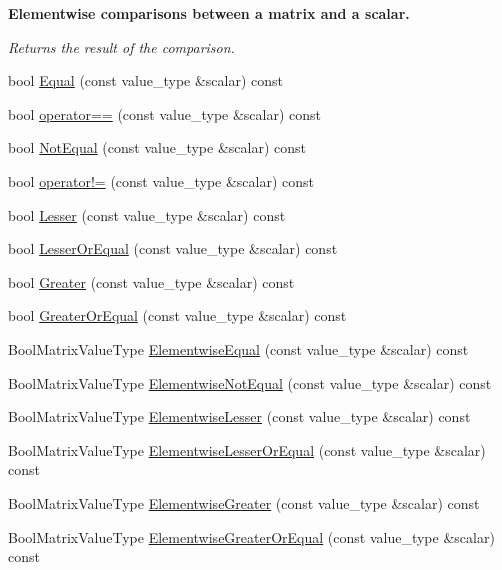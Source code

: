 \begin{Indent}{\bf Elementwise comparisons between a matrix and a scalar.}\par
{\em Returns the result of the comparison. }\begin{DoxyCompactItemize}
\item 
bool \hyperlink{classvct_fixed_size_const_matrix_base_a36ca5ac8c7cbbd004105516500745baf}{Equal} (const value\-\_\-type \&scalar) const 
\item 
bool \hyperlink{classvct_fixed_size_const_matrix_base_a832eede61d79334a7e0fde8916ce9ea0}{operator==} (const value\-\_\-type \&scalar) const 
\item 
bool \hyperlink{classvct_fixed_size_const_matrix_base_a5f29a2fbae7a7f896ebb164b8ce50afd}{Not\-Equal} (const value\-\_\-type \&scalar) const 
\item 
bool \hyperlink{classvct_fixed_size_const_matrix_base_ac801c30c3dbca24f1e1eda638b2d4940}{operator!=} (const value\-\_\-type \&scalar) const 
\item 
bool \hyperlink{classvct_fixed_size_const_matrix_base_ac91aa8965c40898902e4040714ebba1e}{Lesser} (const value\-\_\-type \&scalar) const 
\item 
bool \hyperlink{classvct_fixed_size_const_matrix_base_a1f326162855228b4ad951861f94baede}{Lesser\-Or\-Equal} (const value\-\_\-type \&scalar) const 
\item 
bool \hyperlink{classvct_fixed_size_const_matrix_base_a711d7e0c1e311eda99c2179027790685}{Greater} (const value\-\_\-type \&scalar) const 
\item 
bool \hyperlink{classvct_fixed_size_const_matrix_base_a97bd980245f7123133edd231922b0e77}{Greater\-Or\-Equal} (const value\-\_\-type \&scalar) const 
\item 
Bool\-Matrix\-Value\-Type \hyperlink{classvct_fixed_size_const_matrix_base_ab57c2a6044b81d55564365c2ce227ad3}{Elementwise\-Equal} (const value\-\_\-type \&scalar) const 
\item 
Bool\-Matrix\-Value\-Type \hyperlink{classvct_fixed_size_const_matrix_base_a67c3712172b253e5d69e89841a526998}{Elementwise\-Not\-Equal} (const value\-\_\-type \&scalar) const 
\item 
Bool\-Matrix\-Value\-Type \hyperlink{classvct_fixed_size_const_matrix_base_a2541b7716052fc48983c5c120d9c3271}{Elementwise\-Lesser} (const value\-\_\-type \&scalar) const 
\item 
Bool\-Matrix\-Value\-Type \hyperlink{classvct_fixed_size_const_matrix_base_a15ae9a8d190323603d5900370cc6eaed}{Elementwise\-Lesser\-Or\-Equal} (const value\-\_\-type \&scalar) const 
\item 
Bool\-Matrix\-Value\-Type \hyperlink{classvct_fixed_size_const_matrix_base_a334e8a6640c67d63b4da59effd6c4a09}{Elementwise\-Greater} (const value\-\_\-type \&scalar) const 
\item 
Bool\-Matrix\-Value\-Type \hyperlink{classvct_fixed_size_const_matrix_base_aa6ae540d5cf89b70f1cca6a34adf34e9}{Elementwise\-Greater\-Or\-Equal} (const value\-\_\-type \&scalar) const 
\end{DoxyCompactItemize}
\end{Indent}
